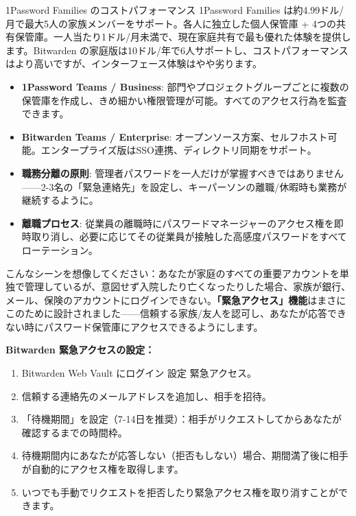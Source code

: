 \begin{tcbinfo}{1Password Families のコストパフォーマンス}
1Password Families は約4.99ドル/月で最大5人の家族メンバーをサポート。各人に独立した個人保管庫 + 4つの共有保管庫。一人当たり1ドル/月未満で、現在家庭共有で最も優れた体験を提供します。Bitwarden の家庭版は10ドル/年で6人サポートし、コストパフォーマンスはより高いですが、インターフェース体験はやや劣ります。

\end{tcbinfo}


\begin{itemize}
  \item \textbf{1Password Teams / Business}: 部門やプロジェクトグループごとに複数の保管庫を作成し、きめ細かい権限管理が可能。すべてのアクセス行為を監査できます。
  \item \textbf{Bitwarden Teams / Enterprise}: オープンソース方案、セルフホスト可能。エンタープライズ版はSSO連携、ディレクトリ同期をサポート。
  \item \textbf{職務分離の原則}: 管理者パスワードを一人だけが掌握すべきではありません——2-3名の「緊急連絡先」を設定し、キーパーソンの離職/休暇時も業務が継続するように。
  \item \textbf{離職プロセス}: 従業員の離職時にパスワードマネージャーのアクセス権を即時取り消し、必要に応じてその従業員が接触した高感度パスワードをすべてローテーション。
\end{itemize}


こんなシーンを想像してください：あなたが家庭のすべての重要アカウントを単独で管理しているが、意図せず入院したり亡くなったりした場合、家族が銀行、メール、保険のアカウントにログインできない。\textbf{「緊急アクセス」機能}はまさにこのために設計されました——信頼する家族/友人を認可し、あなたが応答できない時にパスワード保管庫にアクセスできるようにします。

\textbf{Bitwarden 緊急アクセスの設定：}

\begin{enumerate}
  \item Bitwarden Web Vault にログイン 設定 緊急アクセス。
  \item 信頼する連絡先のメールアドレスを追加し、相手を招待。
  \item 「待機期間」を設定（7-14日を推奨）：相手がリクエストしてからあなたが確認するまでの時間枠。
  \item 待機期間内にあなたが応答しない（拒否もしない）場合、期間満了後に相手が自動的にアクセス権を取得します。
  \item いつでも手動でリクエストを拒否したり緊急アクセス権を取り消すことができます。
\end{enumerate}

